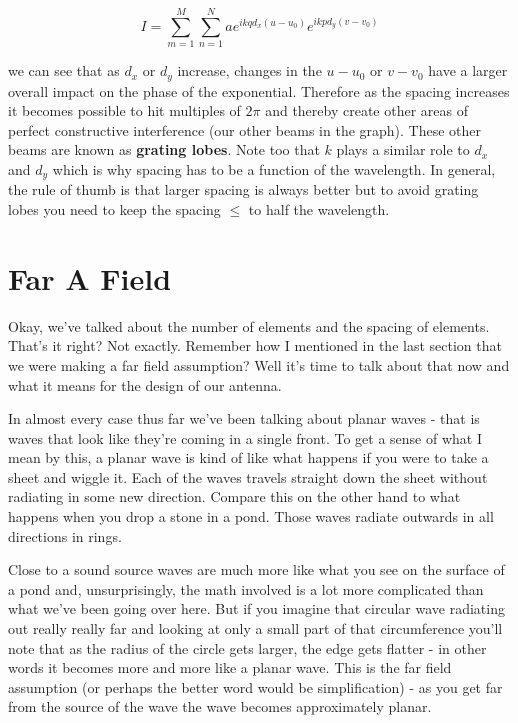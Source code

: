 \documentclass[12pt,a6paper]{book}
\begin{document}
\begin{equation}
I=\sum_{m=1}^M \sum_{n=1}^N  ae^{ikqd_x(u-u_0)}e^{ikpd_y(v-v_0)}
\end{equation}

we can see that as $d_x$ or $d_y$ increase, changes in the $u-u_0$ or $v-v_0$ have a larger overall impact on the phase of the exponential. Therefore as the spacing increases it becomes possible to hit multiples of $2\pi$ and thereby create other areas of perfect constructive interference (our other beams in the graph). These other beams are known as \textbf{grating lobes}. Note too that $k$ plays a similar role to $d_x$ and $d_y$ which is why spacing has to be a function of the wavelength. In general, the rule of thumb is that larger spacing is always better but to avoid grating lobes you need to keep the spacing $\leq$ to half the wavelength. 

\section{Far A Field}
Okay, we've talked about the number of elements and the spacing of elements. That's it right? Not exactly. Remember how I mentioned in the last section that we were making a far field assumption? Well it's time to talk about that now and what it means for the design of our antenna. 

In almost every case thus far we've been talking about planar waves - that is waves that look like they're coming in a single front. To get a sense of what I mean by this, a planar wave is kind of like what happens if you were to take a sheet and wiggle it. Each of the waves travels straight down the sheet without radiating in some new direction. Compare this on the other hand to what happens when you drop a stone in a pond. Those waves radiate outwards in all directions in rings. 

Close to a sound source waves are much more like what you see on the surface of a pond and, unsurprisingly, the math involved is a lot more complicated than what we've been going over here. But if you imagine that circular wave radiating out really really far and looking at only a small part of that circumference you'll note that as the radius of the circle gets larger, the edge gets flatter - in other words it becomes more and more like a planar wave. This is the far field assumption (or perhaps the better word would be simplification) - as you get far from the source of the wave the wave becomes approximately planar. 
\end{document}
